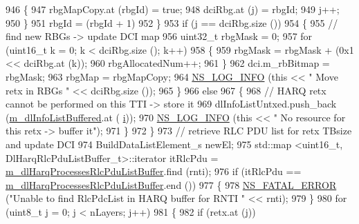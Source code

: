 \begin{DoxyCode}
946                     \{
947                       rbgMapCopy.at (rbgId) = \textcolor{keyword}{true};
948                       dciRbg.at (j) = rbgId;
949                       j++;
950                     \}
951                   rbgId = (rbgId + 1) %
952                 \}
953               \textcolor{keywordflow}{if} (j == dciRbg.size ())
954                 \{
955                   \textcolor{comment}{// find new RBGs -> update DCI map}
956                   uint32\_t rbgMask = 0;
957                   \textcolor{keywordflow}{for} (uint16\_t k = 0; k < dciRbg.size (); k++)
958                     \{
959                       rbgMask = rbgMask + (0x1 << dciRbg.at (k));
960                       rbgAllocatedNum++;
961                     \}
962                   dci.m\_rbBitmap = rbgMask;
963                   rbgMap = rbgMapCopy;
964                   \hyperlink{group__logging_gafbd73ee2cf9f26b319f49086d8e860fb}{NS\_LOG\_INFO} (\textcolor{keyword}{this} << \textcolor{stringliteral}{" Move retx in RBGs "} << dciRbg.size ());
965                 \}
966               \textcolor{keywordflow}{else}
967                 \{
968                   \textcolor{comment}{// HARQ retx cannot be performed on this TTI -> store it}
969                   dlInfoListUntxed.push\_back (\hyperlink{classns3_1_1PfFfMacScheduler_af3c266623addc28fc6ecd97901183a2f}{m\_dlInfoListBuffered}.at (
      \hyperlink{bernuolliDistribution_8m_a6f6ccfcf58b31cb6412107d9d5281426}{i}));
970                   \hyperlink{group__logging_gafbd73ee2cf9f26b319f49086d8e860fb}{NS\_LOG\_INFO} (\textcolor{keyword}{this} << \textcolor{stringliteral}{" No resource for this retx -> buffer it"});
971                 \}
972             \}
973           \textcolor{comment}{// retrieve RLC PDU list for retx TBsize and update DCI}
974           BuildDataListElement\_s newEl;
975           std::map <uint16\_t, DlHarqRlcPduListBuffer\_t>::iterator itRlcPdu =  
      \hyperlink{classns3_1_1PfFfMacScheduler_acf9952b5bb3d26644b5e25054ca6e385}{m\_dlHarqProcessesRlcPduListBuffer}.find (rnti);
976           \textcolor{keywordflow}{if} (itRlcPdu == \hyperlink{classns3_1_1PfFfMacScheduler_acf9952b5bb3d26644b5e25054ca6e385}{m\_dlHarqProcessesRlcPduListBuffer}.end ())
977             \{
978               \hyperlink{group__fatal_ga5131d5e3f75d7d4cbfd706ac456fdc85}{NS\_FATAL\_ERROR} (\textcolor{stringliteral}{"Unable to find RlcPdcList in HARQ buffer for RNTI "} << rnti);
979             \}
980           \textcolor{keywordflow}{for} (uint8\_t j = 0; j < nLayers; j++)
981             \{
982               \textcolor{keywordflow}{if} (retx.at (j))

\end{DoxyCode}
